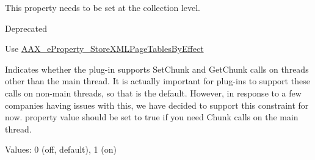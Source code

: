 \begin{Desc}
\begin{description}
This property needs to be set at the collection level. \item[{\em 
\hypertarget{a00283_a6571f4e41a5dd06e4067249228e2249eae555ac90959bcee0301eed22dff52b03}{}A\+A\+X\+\_\+e\+Property\+\_\+\+Store\+X\+M\+L\+Page\+Tables\+By\+Type\label{a00283_a6571f4e41a5dd06e4067249228e2249eae555ac90959bcee0301eed22dff52b03}
}]\begin{DoxyRefDesc}{Deprecated}
\item[\hyperlink{a00386__deprecated000018}{Deprecated}]Use \hyperlink{a00283_a6571f4e41a5dd06e4067249228e2249ea1837e77c3a427004ac44714a8c9cbad9}{A\+A\+X\+\_\+e\+Property\+\_\+\+Store\+X\+M\+L\+Page\+Tables\+By\+Effect} \end{DoxyRefDesc}
\item[{\em 
\hypertarget{a00283_a6571f4e41a5dd06e4067249228e2249ea01bd38243e95666d55b80e79bc13c5cb}{}A\+A\+X\+\_\+e\+Property\+\_\+\+Requires\+Chunk\+Calls\+On\+Main\+Thread\label{a00283_a6571f4e41a5dd06e4067249228e2249ea01bd38243e95666d55b80e79bc13c5cb}
}]Indicates whether the plug-\/in supports Set\+Chunk and Get\+Chunk calls on threads other than the main thread. It is actually important for plug-\/ins to support these calls on non-\/main threads, so that is the default. However, in response to a few companies having issues with this, we have decided to support this constraint for now. property value should be set to true if you need Chunk calls on the main thread.

Values\+: 0 (off, default), 1 (on)


\end{description}
\end{Desc}
